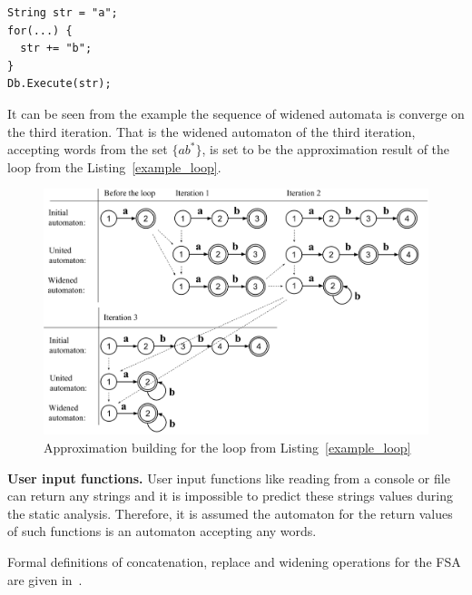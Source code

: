 \documentclass{sig-alternate-05-2015}
\begin{document}
\begin{lstlisting}[label=example_loop,caption=Loop with concatenation on C\#]
String str = "a";
for(...) {
  str += "b";
}     	
Db.Execute(str);
\end{lstlisting}

It can be seen from the example the sequence of widened automata is converge on the third iteration. That is the widened automaton of the third iteration, accepting words from the set $\{ ab^{*} \}$, is set to be the approximation result of the loop from the Listing~\ref{example_loop}.

\begin{figure}[h!]
    \begin{center}
        \includegraphics[scale=0.3]{Figures/automata_loop.png}
    \end{center}
    \caption{Approximation building for the loop from Listing~\ref{example_loop}}
    \label{automata_loop_pic}
\end{figure} 

\textbf{User input functions.} User input functions like reading from a console or file can return any strings and it is impossible to predict these strings values during the static analysis. Therefore, it is assumed the automaton for the return values of such functions is an automaton accepting any words.

Formal definitions of concatenation, replace and widening operations for the FSA are given in~\cite{Upper_Approximation:ref}.
\end{document}

